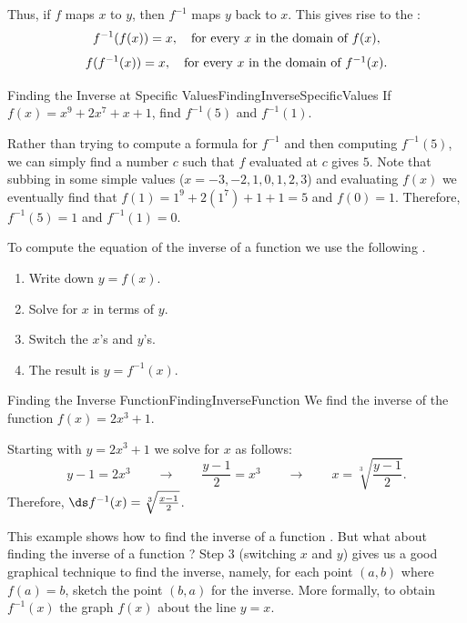 Thus, if $f$ maps $x$ to $y$, then $f^{-1}$ maps $y$ back to $x$.
This gives rise to the :
$$f^{-1}(f(x))=x,\mbox{\quad for every $x$ in the domain of $f(x)$},$$
$$f(f^{-1}(x))=x,\mbox{\quad for every $x$ in the domain of $f^{-1}(x)$}.$$

\begin{example}{Finding the Inverse at Specific Values}{FindingInverseSpecificValues}
If $f(x)=x^9+2x^7+x+1$, find $f^{-1}(5)$ and $f^{-1}(1)$.
\end{example}

\begin{solution} 
Rather than trying to compute a formula for $f^{-1}$ and then computing $f^{-1}(5)$, we can simply find a number $c$ such that $f$ evaluated at $c$ gives $5$.
Note that subbing in some simple values ($x=-3,-2,1,0,1,2,3$) and evaluating $f(x)$ we eventually find that $f(1)=1^9+2(1^7)+1+1=5$ and $f(0)=1$.
Therefore, $f^{-1}(5)=1$ and $f^{-1}(1)=0$.
\end{solution} 

To compute the equation of the inverse of a function we use the following .

\begin{formulabox}
\begin{enumerate}\itemsep0pt
	\item Write down $y=f(x)$.
	\item Solve for $x$ in terms of $y$.
	\item Switch the $x$'s and $y$'s.
	\item The result is $y=f^{-1}(x)$.
\end{enumerate}
\end{formulabox}

\begin{example}{Finding the Inverse Function}{FindingInverseFunction}
We find the inverse of the function $f(x)=2x^3+1.$
\end{example}

\begin{solution} 
Starting with $y=2x^3+1$ we solve for $x$ as follows:
$$y-1=2x^3\qquad\to\qquad \frac{y-1}{2}=x^3\qquad\to\qquad x=\sqrt[3]{\frac{y-1}{2}}.$$
Therefore, $\ds f^{-1}(x)=\sqrt[3]{\frac{x-1}{2}}$.
\end{solution}

This example shows how to find the inverse of a function .
But what about finding the inverse of a function ?
Step $3$ (switching $x$ and $y$) gives us a good graphical technique to find the inverse, namely, 
for each point $(a,b)$ where $f(a)=b$, sketch the point $(b,a)$ for the inverse.
More formally, to obtain $f^{-1}(x)$  the graph $f(x)$ about the line $y=x$.

